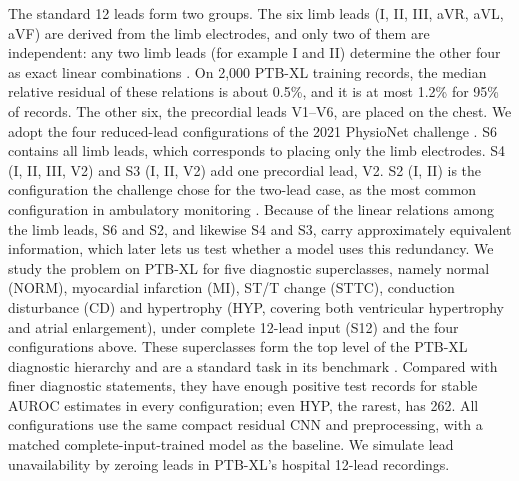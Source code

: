 The standard 12 leads form two groups. The six limb leads (I, II, III, aVR, aVL, aVF) are derived from the limb electrodes, and only two of them are independent: any two limb leads (for example I and II) determine the other four as exact linear combinations \citep{reyna2022issues}. On 2,000 PTB-XL training records, the median relative residual of these relations is about 0.5\%, and it is at most 1.2\% for 95\% of records. The other six, the precordial leads V1--V6, are placed on the chest. We adopt the four reduced-lead configurations of the 2021 PhysioNet challenge \citep{reyna2022issues}. S6 contains all limb leads, which corresponds to placing only the limb electrodes. S4 (I, II, III, V2) and S3 (I, II, V2) add one precordial lead, V2. S2 (I, II) is the configuration the challenge chose for the two-lead case, as the most common configuration in ambulatory monitoring \citep{reyna2022issues}. Because of the linear relations among the limb leads, S6 and S2, and likewise S4 and S3, carry approximately equivalent information, which later lets us test whether a model uses this redundancy. We study the problem on PTB-XL for five diagnostic superclasses, namely normal (NORM), myocardial infarction (MI), ST/T change (STTC), conduction disturbance (CD) and hypertrophy (HYP, covering both ventricular hypertrophy and atrial enlargement), under complete 12-lead input (S12) and the four configurations above. These superclasses form the top level of the PTB-XL diagnostic hierarchy and are a standard task in its benchmark \citep{strodthoff2021benchmark}. Compared with finer diagnostic statements, they have enough positive test records for stable AUROC estimates in every configuration; even HYP, the rarest, has 262. All configurations use the same compact residual CNN and preprocessing, with a matched complete-input-trained model as the baseline. We simulate lead unavailability by zeroing leads in PTB-XL's hospital 12-lead recordings.

